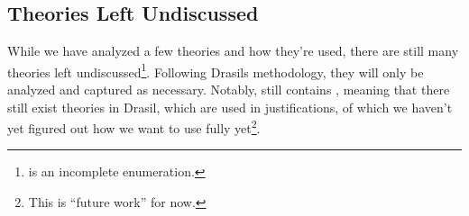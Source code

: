 \subsection{Theories Left Undiscussed}
\label{chap:more-theory-kinds:sec:classify-all-the-theories:subsec:theories-left-undiscussed}

While we have analyzed a few theories and how they're used, there are still many
theories left undiscussed\footnote{\ModelKinds{} is an incomplete enumeration.}.
Following Drasils methodology, they will only be analyzed and captured as
necessary. Notably, \ModelKinds{} still contains \OthModel{}, meaning that there
still exist theories in Drasil, which are used in justifications, of which we
haven't yet figured out how we want to use fully yet\footnote{This is ``future
	work'' for now.}.
